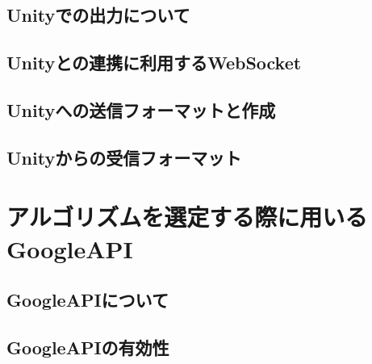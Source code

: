 \subsection{Unityでの出力について}
\subsection{Unityとの連携に利用するWebSocket}
\subsection{Unityへの送信フォーマットと作成}
\subsection{Unityからの受信フォーマット}

\section{アルゴリズムを選定する際に用いるGoogleAPI}
\subsection{GoogleAPIについて}
\subsection{GoogleAPIの有効性}
